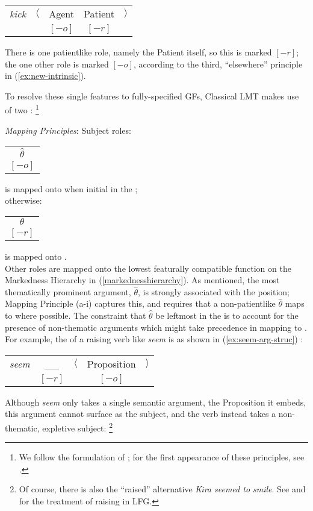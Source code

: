 \documentclass[output=paper]{langscibook}
\begin{document}
\ea\label{ex:kick-astruc}
\begin{tabular}[t]{lrccl}
  \textit{kick}&$\langle$ & Agent & Patient & $\rangle$\\
  &&$[-o]$&$[-r]$
\end{tabular}
\z
%
There is one patientlike role, namely the Patient itself, so this is marked
$[-r]$; the one other role is marked $[-o]$, according to the third,
``elsewhere'' principle in (\ref{ex:new-intrinsic}).

To resolve these single features to fully-specified GFs, Classical LMT makes use
of two :%
%
\footnote{We follow the formulation of \citet[334]{BresnanEtAl2016}; for the
  first appearance of these principles, see \citet[51]{bresnanzaenen90}.}
%

\ea\label{ex:mapping-principles}%
\textit{Mapping Principles}:%
\ea%
Subject roles:%
\ea
\begin{tabular}[t]{c}
  $\hat\theta$\\$[-o]$
\end{tabular}
is mapped onto \SUBJ when initial in the
\astruc{};\\[1.5ex]%
otherwise:%
\ex
\begin{tabular}[t]{c} $\theta$ \\ $[-r]$ \end{tabular}
is mapped onto \SUBJ.\\[1.5ex]%
\z%
\ex%
Other roles are mapped onto the lowest featurally compatible function on the
Markedness Hierarchy in (\ref{markednesshierarchy}).
\z
\z
%
\largerpage
As mentioned, the most thematically prominent argument, $\hat\theta$, is strongly associated with the \SUBJ position; Mapping Principle (a-i) captures this, and requires that a non-patientlike $\hat\theta$ maps to \SUBJ where possible. The constraint that $\hat\theta$ be leftmost in the \astruc{} is to account for the presence of non-thematic arguments which might take precedence in mapping to \SUBJ. For example, the \astruc{} of a raising verb like \textit{seem} is as shown in (\ref{ex:seem-arg-struc}) \citep[200]{zaeneng94}:

\ea\label{ex:seem-arg-struc}
\begin{tabular}[t]{lcrcl}
  \textit{seem}& \_\_ & $\langle$ & Proposition & $\rangle$\\
  & $[-r]$ & &$[-o]$
\end{tabular}
\z
%
Although \textit{seem} only takes a single semantic argument, the Proposition it
embeds, this argument cannot surface as the subject, and the verb instead takes
a non-thematic, expletive subject:%
%
\footnote{Of course, there is also the ``raised'' alternative \textit{Kira
    seemed to smile}. See \citet{zaeneng94} and \citet[ch.~15]{DLM:LFG} for the
  treatment of raising in LFG.}
%
\end{document}
